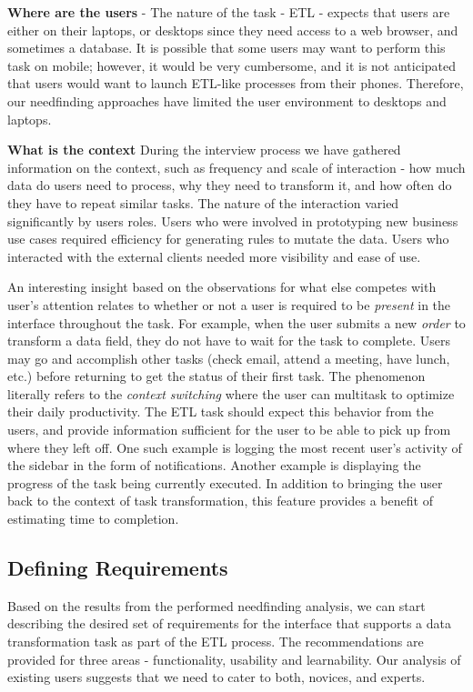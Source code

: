 \documentclass[12pt,letterpaper]{article}
\begin{document}
\textbf{Where are the users} - The nature of the task - ETL - expects that users are either on their laptops, or desktops since they need access to a web browser, and sometimes a database. It is possible that some users may want to perform this task on mobile; however, it would be very cumbersome, and it is not anticipated that users would want to launch ETL-like processes from their phones. Therefore, our needfinding approaches have limited the user environment to desktops and laptops. 

\textbf{What is the context} During the interview process we have gathered information on the context, such as frequency and scale of interaction - how much data do users need to process, why they need to transform it, and how often do they have to repeat similar tasks. The nature of the interaction varied significantly by users roles. Users who were involved in prototyping new business use cases required efficiency for generating rules to mutate the data. Users who interacted with the external clients needed more visibility and ease of use. 

An interesting insight based on the observations for what else competes with user's attention relates to whether or not a user is required to be \textit{present} in the interface throughout the task. For example, when the user submits a new \textit{order} to transform a data field, they do not have to wait for the task to complete. Users may go and accomplish other tasks (check email, attend a meeting, have lunch, etc.) before returning to get the status of their first task. The phenomenon literally refers to the \textit{context switching} where the user can multitask to optimize their daily productivity. The ETL task should expect this behavior from the users, and provide information sufficient for the user to be able to pick up from where they left off. One such example is logging the most recent user's activity of the sidebar in the form of notifications. Another example is displaying the progress of the task being currently executed. In addition to bringing the user back to the context of task transformation, this feature provides a benefit of estimating time to completion. 


\subsection*{Defining Requirements}

Based on the results from the performed needfinding analysis, we can start describing the desired set of requirements for the interface that supports a data transformation task as part of the ETL process. The recommendations are provided for three areas - functionality, usability and learnability. Our analysis of existing users suggests that we need to cater to both, novices, and experts. 
\end{document}
